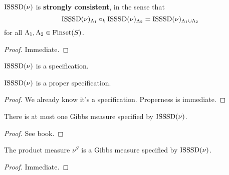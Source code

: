 \begin{lemma}
    \label{lem:isssd-strong-consistency}
    \leanok

    $\operatorname{ISSSD}(\nu)$ is {\bf strongly consistent}, in the sense that
    $$\operatorname{ISSSD}(\nu)_{\Lambda_1} \circ_k \operatorname{ISSSD}(\nu)_{\Lambda_2} = \operatorname{ISSSD}(\nu)_{\Lambda_1 \cup \Lambda_2}$$
    for all $\Lambda_1, \Lambda_2 \in \operatorname{Finset}(S)$.
\end{lemma}
\begin{proof}

  Immediate.
\end{proof}

\begin{definition}
    \label{def:isssd-specification}
    \leanok

    $\operatorname{ISSSD}(\nu)$ is a specification.
\end{definition}

\begin{lemma}
    \label{lem:isssd-proper-specification}
    \leanok

    $\operatorname{ISSSD}(\nu)$ is a proper specification.
\end{lemma}
\begin{proof}

    We already know it's a specification. Properness is immediate.
\end{proof}

\begin{lemma}
    \label{lem:isssd-gibbs-meas-uniqueness}

    There is at most one Gibbs measure specified by $\operatorname{ISSSD}(\nu)$.
\end{lemma}
\begin{proof}

    See book.
\end{proof}

\begin{lemma}
    \label{lem:isssd-gibbs-meas-existence}

    The product measure $\nu^S$ is a Gibbs measure specified by $\operatorname{ISSSD}(\nu)$.
\end{lemma}
\begin{proof}

   Immediate.
\end{proof}

